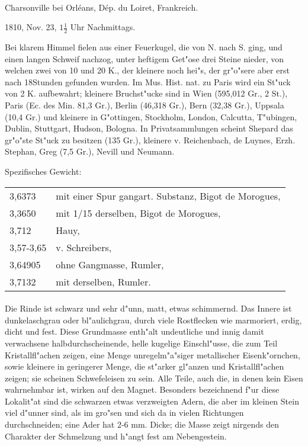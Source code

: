 \documentclass[a4paper, 11pt, oneside]{article}
\begin{document}
\paragraph{}
Charsonville bei Orléans, Dép. du Loiret, Frankreich.

1810, Nov. 23, $1\frac{1}{2}$ Uhr Nachmittags.

Bei klarem Himmel fielen aus einer Feuerkugel, die von N. nach S. ging, und einen langen Schweif nachzog, unter heftigem Get"ose drei Steine nieder, von welchen zwei von 10 und 20 K., der kleinere noch hei"s, der gr"o"sere aber erst nach 18Stunden gefunden wurden. Im Mus. Hist. nat. zu Paris wird ein St"uck von 2 K. aufbewahrt; kleinere Bruchst"ucke sind in Wien (595,012 Gr., 2 St.), Paris (Ec. des Min. 81,3 Gr.), Berlin (46,318 Gr.), Bern (32,38 Gr.), Uppsala (10,4 Gr.) und kleinere in G"ottingen, Stockholm, London, Calcutta, T"ubingen, Dublin, Stuttgart, Hudson, Bologna. In Privatsammlungen scheint Shepard das gr"o"ste St"uck zu besitzen (135 Gr.), kleinere v. Reichenbach, de Luynes, Erzh. Stephan, Greg (7,5 Gr.), Nevill und Neumann.

Spezifisches Gewicht:
\begin{table}[!ht]
    \centering
    \begin{tabular}{l l}
        3,6373 & mit einer Spur gangart. Substanz, Bigot de Morogues,\\
        3,3650 & mit 1/15 derselben, Bigot de Morogues,\\
        3,712 & Hauy,\\
        3,57-3,65 & v. Schreibers,\\
        3,64905 & ohne Gangmasse, Rumler,\\
        3,7132 & mit derselben, Rumler.
    \end{tabular}
\end{table}
\paragraph{}
Die Rinde ist schwarz und sehr d"unn, matt, etwas schimmernd. Das Innere ist dunkelaschgrau oder bl"aulichgrau, durch viele Rostflecken wie marmoriert, erdig, dicht und fest. Diese Grundmasse enth"alt undeutliche und innig damit verwachsene halbdurchscheinende, helle kugelige Einschl"usse, die zum Teil Kristallfl"achen zeigen, eine Menge unregelm"a"siger metallischer Eisenk"ornchen, sowie kleinere in geringerer Menge, die st"arker gl"anzen und Kristallfl"achen zeigen; sie scheinen Schwefeleisen zu sein. Alle Teile, auch die, in denen kein Eisen wahrnehmbar ist, wirken auf den Magnet. Besonders bezeichnend f"ur diese Lokalit"at sind die schwarzen etwas verzweigten Adern, die aber im kleinen Stein viel d"unner sind, als im gro"sen und sich da in vielen Richtungen durchschneiden; eine Ader hat 2-6 mm. Dicke; die Masse zeigt nirgends den Charakter der Schmelzung und h"angt fest am Nebengestein.
\end{document}
